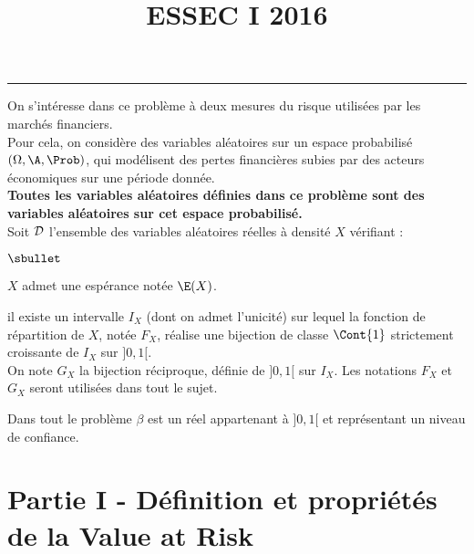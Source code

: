 \documentclass[11pt]{article}%
\title{\bf \vspace{-1.6cm} ESSEC I 2016} %
\author{} %
\date{} %
\begin{document}
\maketitle %
\vspace{-1.2cm}\hrule %
\thispagestyle{fancy}

\vspace*{.4cm}


\noindent
On s'intéresse dans ce problème à deux mesures du risque utilisées 
par les marchés financiers.\\
Pour cela, on considère des variables aléatoires sur un espace 
probabilisé $(\Omega,\A,\Prob)$, qui modélisent des pertes 
financières subies par des acteurs économiques sur une période donnée.\\
{\bf Toutes les variables aléatoires définies dans ce problème 
sont des variables aléatoires sur cet espace probabilisé.}\\
Soit ${\cal D}$ l'ensemble des variables aléatoires réelles à 
densité $X$ vérifiant :
\begin{noliste}{$\sbullet$}
  \item $X$ admet une espérance notée $\E(X)$.
  \item il existe un intervalle $I_X$ (dont on admet 
  l'unicité) sur lequel la fonction de répartition de $X$, notée 
  $F_X$, réalise une bijection de classe $\Cont{1}$ strictement 
  croissante de $I_X$ sur $]0,1[$.\\
  On note $G_X$ la bijection réciproque, définie de $]0,1[$ sur 
  $I_X$. Les notations $F_X$ et $G_X$ seront utilisées dans tout 
  le sujet.
\end{noliste}
Dans tout le problème $\beta$ est un réel appartenant à $]0,1[$ et 
représentant un niveau de confiance.

\section*{Partie I - Définition et propriétés de la \og Value at 
Risk \fg}
\end{document}
